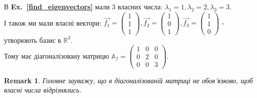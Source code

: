 \documentclass[a4paper, 10pt]{article}
\theoremstyle{theoremdd}
\newtheorem{remark}[theorem]{Remark}
\newcommand\exref[1]{\textbf{Ex.~\ref{#1}}}
\begin{document}
В \exref{find_eigenvectors} мали 3 власних числа: $\lambda_1 = 1, \lambda_2 = 2,\lambda_3 = 3$.\\
І також ми мали власні вектори: $\vec{f_1} = \begin{pmatrix}
1 \\ 1 \\ 1
\end{pmatrix}, \vec{f_2} = \begin{pmatrix}
1 \\ 0 \\ 1
\end{pmatrix}, \vec{f_3} = \begin{pmatrix}
1 \\ 1 \\ 0
\end{pmatrix}$ - утворюють базис в $\mathbb{R}^3$.\\
Тому має діагоналізовану матрицю $\mathbb{A}_f = \begin{pmatrix}
1 & 0 & 0 \\
0 & 2 & 0 \\
0 & 0 & 3
\end{pmatrix}$.
\iffalse
Ба більше, ми можемо розкрити деякі цікаві факти\\
\begin{tikzcd}
\mathbb{R}^3_f \arrow{r}{\mathbb{A}_f} \arrow{d}[swap]{U} & \mathbb{R}^3_f \arrow{d}{U} \\
\mathbb{R}^3_e \arrow{r}{A} & \mathbb{R}^3_e
\end{tikzcd}\\
Тут $U = \begin{pmatrix}
1 & 1 & 1 \\
1 & 0 & 1 \\
1 & 1 & 0 \\
\end{pmatrix}$\\
З картинки можна знайти:\\
$A = U \mathbb{A}_f U^{-1}$\\
$A^2 = A\cdot A = U \mathbb{A}_f U^{-1} U \mathbb{A}_f U^{-1} = U \mathbb{A}_f^2 U^{-1}$\\
$A^3 = A^2 \cdot A = U \mathbb{A}^2_f U^{-1} U \mathbb{A}_f U^{-1} = U \mathbb{A}_f^3 U^{-1}$\\
Ну і т.д.
\fi
\begin{remark}
Головне зауважу, що в діагоналізованій матриці не обов'язково, щоб власні числа відрізнялись.
\end{remark}
\end{document}
